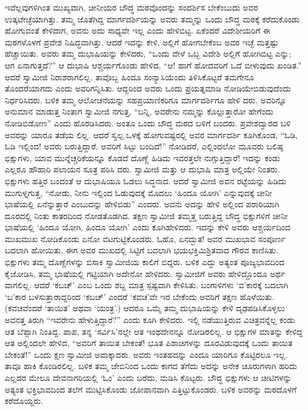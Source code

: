 ಇವೆಲ್ಲವುಗಳಿಗಿಂತ ಮುಖ್ಯವಾಗಿ, ಚೀನೀಯರ ಬೌದ್ಧ ಮಠವೊಂದನ್ನು ಸಂದರ್ಶಿಸ ಬೇಕೆಂಬುದು ಅವರ ಉತ್ಕಟೇಚ್ಛೆಯಾಗಿತ್ತು. ತಮ್ಮ ಜೊತೆಗಿದ್ದ ಮಾರ್ಗದರ್ಶಿಯನ್ನು ಅವರು ತಮ್ಮನ್ನು ಒಂದು ಬೌದ್ಧ ಮಠಕ್ಕೆ ಕರೆದುಕೊಂಡು ಹೋಗುವಂತೆ ಕೇಳಿದಾಗ, ಅವನು ಅದು ಸಾಧ್ಯವೇ ಇಲ್ಲ ಎಂದು ಹೇಳಿಬಿಟ್ಟ. ಏಕೆಂದರೆ ವಿದೇಶೀಯರಿಗೆ ಈ ಮಠಗಳೊಳಗೆ ಪ್ರವೇಶ ನಿಷಿದ್ಧವಾಗಿತ್ತು. ಆದರೆ ಇದನ್ನು ಕೇಳಿ, ಅಲ್ಲಿಗೆ ಹೋಗಬೇಕೆಂಬ ಅವರ ಇಚ್ಛೆ ಮತ್ತಷ್ಟು ಹೆಚ್ಚಾಯಿತು. ಅವರು ತಮ್ಮ ದುಭಾಷಿಯನ್ನು ಕೇಳಿದರು, “ಒಂದು ವೇಳೆ ಒಬ್ಬ ವಿದೇಶಿ ಅಲ್ಲಿಗೆ ಹೋಗಿಬಿಟ್ಟ ಎನ್ನು; ಆಗ ಏನಾಗುತ್ತದೆ?” ಆ ದುಭಾಷಿ ಆಶ್ಚರ್ಯಗೊಂಡು ಹೇಳಿದ, “ಆ! ಹಾಗೆ ಹೋದವರಿಗೆ ಒದೆ ಬೀಳುವುದು ಖಂಡಿತ.” ಆದರೆ ಸ್ವಾಮೀಜಿ ನಿರಾಶರಾಗಲಿಲ್ಲ. ತಾವೊಬ್ಬ ಹಿಂದೂ ಸಂನ್ಯಾಸಿಯೆಂದು ತಿಳಿಸಿಕೊಟ್ಟರೆ ತಮಗೇನೂ ತೊಂದರೆಯಾಗದು ಎಂದು ಅವರಿಗನ್ನಿಸಿತು. ಆದ್ದರಿಂದ ಅವರು ಒಂದು ಪ್ರಯತ್ನಮಾಡಿ ನೋಡಿಯೇಬಿಡುವುದೆಂದು ನಿರ್ಧರಿಸಿದರು. ಬಳಿಕ ತಮ್ಮ ಆಲೋಚನೆಯನ್ನು ಸಹಪ್ರಯಾಣಿಕರಿಗೂ ಮಾರ್ಗದರ್ಶಿಗೂ ಹೇಳಿ ದರು. ಅವರಿನ್ನೂ ಅನುಮಾನ ಮಾಡುತ್ತ ನಿಂತಾಗ ಸ್ವಾಮೀಜಿ ನಗುತ್ತ, “ಬನ್ನಿ, ಅವರೇನು ನಮ್ಮನ್ನು ಕೊಲ್ಲುತ್ತಾರೋ ಹೇಗೆಂದು ನೋಡಿಬಿಡೋಣ” ಎಂದು ಹೊರಡಿಸಿದರು. ಅಂತೂ ಒಂದು ಬೌದ್ಧ ಮಠದ ಬಳಿಗೆ ಬಂದರು. ಪ್ರವೇಶದ್ವಾರದ ಬಳಿ ಅವರನ್ನು ಯಾರೂ ತಡೆಯ ಲಿಲ್ಲ. ಆದರೆ ಸ್ವಲ್ಪ ಒಳಕ್ಕೆ ಹೋಗುವಷ್ಟರಲ್ಲಿ ಅವರ ಮಾರ್ಗದರ್ಶಿ ಕೂಗಿಕೊಂಡ, “ಓಡಿ, ಓಡಿ ಇಲ್ಲಿಂದ! ಅವರು ಬರುತ್ತಿದ್ದಾರೆ. ಅವರಿಗೆ ಸಿಟ್ಟು ಬಂದಿದೆ!” ನೋಡಿದರೆ, ಎಲ್ಲಿಂದಲೋ ಮೂವರು ಬಲಿಷ್ಠ ಭಿಕ್ಷುಗಳು, ಯಾವ ಮುನ್ನೆಚ್ಚರಿಕೆಯನ್ನೂ ಕೊಡದೆ ದೊಣ್ಣೆ ಹಿಡಿದು ಇವರತ್ತಲೇ ನುಗ್ಗುತ್ತಿದ್ದಾರೆ! ಇದನ್ನು ಕಂಡು ಎಲ್ಲರೂ ಹೌಹಾರಿ ಪಲಾಯನ ಸೂತ್ರ ಪಠಿಸಿ ದರು. ಸ್ವಾಮೀಜಿ ಮತ್ತು ಆ ದುಭಾಷಿ ಮಾತ್ರ ಅಲ್ಲಿಯೇ ನಿಂತರು. ಭಿಕ್ಷುಗಳು ಹತ್ತಿರ ಬಂದಂತೆ ಆ ದುಭಾಷಿಯೂ ಓಡಲು ಸಿದ್ಧನಾದ. ಆದರೆ ಸ್ವಾಮೀಜಿ ಅವನ ರಟ್ಟೆಯನ್ನು ಹಿಡಿದು ಮುಗುಳ್ನಗುತ್ತ, “ನೋಡು, ನೀನು ಇಲ್ಲಿಂದ ಓಡುವುದಕ್ಕೆ ಮೊದಲು ‘ಹಿಂದೂ ಯೋಗಿ’ ಎನ್ನುವುದಕ್ಕೆ ಚೀನೀ ಭಾಷೆಯಲ್ಲಿ ಏನೆನ್ನುತ್ತಾರೆ ಎಂಬುದನ್ನು ಹೇಳಿಬಿಡು” ಎಂದರು. ಅವನು ಅದನ್ನು ಹೇಳಿ ಅಲ್ಲಿಂದ ಪರಾರಿಯಾಗಿ ದೂರದಲ್ಲಿ ನಿಂತು ಕಾತರದಿಂದ ನೋಡತೊಡಗಿದ. ತಕ್ಷಣ ಸ್ವಾಮೀಜಿ ತಮ್ಮತ್ತ ಬರುತ್ತಿದ್ದ ಬೌದ್ಧ ಭಿಕ್ಷುಗಳಿಗೆ ಚೀನೀ ಭಾಷೆಯಲ್ಲಿ ‘ಹಿಂದೂ ಯೋಗಿ, ಹಿಂದೂ ಯೋಗಿ’ ಎಂದು ಕೂಗಿಹೇಳಿದರು. ಇದನ್ನು ಕೇಳಿ ಅವರು ಆಶ್ಚರ್ಯದಿಂದ ಮುಖಮುಖ ನೋಡಿಕೊಂಡು ಏನೋ ವಟಗುಟ್ಟಿಕೊಂಡರು. ಓಹೊ, ಏನದ್ಭುತ! ಅವರ ಮುಖಭಾವ ಸಂಪೂರ್ಣ ಬದಲಾಗಿ ಹೋಯಿತು. ಈಗ ಅವರ ಮುಖದಲ್ಲಿ ಸಿಟ್ಟಿಗೆ ಬದಲಾಗಿ ಭಯಭಕ್ತಿಮಿಶ್ರಿತವಾದ ಗೌರವ ಕಾಣಿಸಿತು. ಭಿಕ್ಷುಗಳು ತಮ್ಮ ದೊಣ್ಣೆಗಳನ್ನು ಬಿಸಾಕಿ ಸ್ವಾಮೀಜಿಯ ಕಾಲಿಗೆ ಬಿದ್ದರು. ಬಳಿಕ ಎದ್ದು ಅತ್ಯಂತ ಪೂಜ್ಯಭಾವದಿಂದ ಕೈಜೋಡಿಸಿ, ತಮ್ಮ ಭಾಷೆಯಲ್ಲಿ ಗಟ್ಟಿಯಾಗಿ ಅದೇನೋ ಹೇಳಿದರು. ಸ್ವಾಮೀಜಿಗೆ ಅವರು ಹೇಳಿದ್ದೊಂದೂ ಅರ್ಥ ವಾಗಲಿಲ್ಲ. ಆದರೆ ‘ಕಬಚ್​’ ಎಂಬ ಒಂದು ಶಬ್ದ ಮಾತ್ರ ಸ್ಪಷ್ಟವಾಗಿ ಕೇಳಿಸಿತು. ಬಂಗಾಳಿಗಳು ‘ವ’ಕಾರಕ್ಕೆ ಬದಲಾಗಿ ‘ಬ’ಕಾರ ಬಳಸುತ್ತಾರಾದ್ದರಿಂದ ‘ಕಬಚ್​’ ಎಂದರೆ ‘ಕವಚ’ವೇ ಇರ ಬೇಕೆಂದು ಅವರಿಗೆ ತಕ್ಷಣ ಹೊಳೆಯಿತು. (ಕವಚವೆಂದರೆ ‘ತಾಯಿತ’ ಅಥವಾ ‘ಯಂತ್ರ’.) ಆದರೂ ಒಮ್ಮೆ ತಮ್ಮ ದುಭಾಷಿಯನ್ನು ಕೇಳಿ ದೃಢಪಡಿಸಿಕೊಳ್ಳಲು ಅವನತ್ತ ತಿರುಗಿ “ಇವರೇನು ಹೇಳುತ್ತಿದ್ದಾರೆ?” ಎಂದು ಕೂಗಿ ಕೇಳಿದರು. ಇಲ್ಲಿ ನಡೆಯುತ್ತಿರುವ ವಿಚಿತ್ರವನ್ನೆಲ್ಲ ಕಂಡು ಆತ ಬೆಪ್ಪಾಗಿ ನಿಂತಿದ್ದ. ಪಾಪ, ತನ್ನ ‘ಸರ್ವಿಸಿ’ನಲ್ಲೇ ಆತ ಇಂಥದೇನನ್ನೂ ನೋಡಿರಲಿಲ್ಲ. ಆ ಭಿಕ್ಷುಗಳ ಮಾತನ್ನು ಕೇಳಿದ್ದ ಆತ ಅಲ್ಲಿಂದಲೇ ಹೇಳಿದ, “ಅವರಿಗೆ ತಾಯಿತ ಬೇಕಂತೆ! ಭೂತ ಪಿಶಾಚಿಗಳನ್ನು ದೂರವಿಡುವುದಕ್ಕೆ ಒಂದು ತಾಯಿತ ಬೇಕಂತೆ!” ಒಂದು ಕ್ಷಣ ಸ್ವಾಮೀಜಿ ಅವಾಕ್ಕಾದರು. ಅವರು ಇಂತಹದನ್ನು ಎಂದೂ ಯಾರಿಗೂ ಕೊಟ್ಟಿರಲೂ ಇಲ್ಲ. ತಾವೂ ಹಾಕಿ ಕೊಂಡಿರಲಿಲ್ಲ. ಬಳಿಕ ತಮ್ಮ ಜೇಬಿನಿಂದ ಒಂದು ಕಾಗದ ತೆಗೆದು ಅದನ್ನು ಅನೇಕ ಚೂರುಗಳಾಗಿ ಹರಿದು ಎಲ್ಲದರ ಮೇಲೂ ದೇವನಾಗರಿಯಲ್ಲಿ ‘ಓಂ’ ಎಂದು ಬರೆದು, ಮಡಿಸಿ ಕೊಟ್ಟರು. ಬೌದ್ಧ ಭಿಕ್ಷುಗಳು ಆ ಚೀಟಿಗಳನ್ನು ಅತ್ಯಂತ ಭಕ್ತಿಭಾವದಿಂದ ತಲೆಗೆ ಮುಟ್ಟಿಸಿಕೊಂಡು ಜೋಪಾನವಾಗಿ ಎತ್ತಿಟ್ಟುಕೊಂಡರು. ಬಳಿಕ ಅವರನ್ನು ಮಠದೊಳಗೆ ಕರೆದೊಯ್ದರು.

